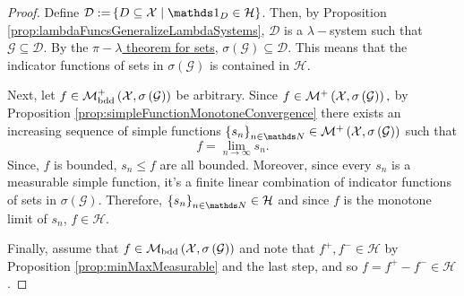 \begin{proof}
Define $\mathcal{D:=}\left\{ D\subseteq\X\mid\indicate_{D}\in\mathcal{H}\right\} $.
Then, by Proposition \ref{prop:lambdaFuncsGeneralizeLambdaSystems},
$\mathcal{D}$ is a $\lambda-$system such that $\mathcal{G}\subseteq\mathcal{D}.$
By the \hyperref[cor:piLambdaGeneratingClassArg]{$\pi-\lambda$ theorem for sets},
$\sigma\left(\mathcal{G}\right)\subseteq\mathcal{D}$. This means
that the indicator functions of sets in $\sigma\left(\mathcal{G}\right)$
is contained in $\mathcal{H}$.

Next, let $f\in\mathcal{M}_{\text{bdd}}^{+}\left(\mathcal{X},\sigma\left(\mathcal{G}\right)\right)$
be arbitrary. Since $f\in\mathcal{M}^{+}\left(\mathcal{X},\sigma\left(\mathcal{G}\right)\right),$
by Proposition \ref{prop:simpleFunctionMonotoneConvergence} there
exists an increasing sequence of simple functions $\left\{ s_{n}\right\} _{n\in\N}\in\mathcal{M}^{+}\left(\X,\sigma\left(\mathcal{G}\right)\right)$
such that 
\[
f=\lim_{n\to\infty}s_{n}.
\]
Since, $f$ is bounded, $s_{n}\leq f$ are all bounded. Moreover,
since every $s_{n}$ is a measurable simple function, it's a finite
linear combination of indicator functions of sets in $\sigma\left(\mathcal{G}\right)$.
Therefore, $\left\{ s_{n}\right\} _{n\in\N}\in\mathcal{H}$ and since
$f$ is the monotone limit of $s_{n}$, $f\in\mathcal{H}$.

Finally, assume that $f\in\mathcal{M}_{\textnormal{bdd}}\left(\mathcal{X},\sigma\left(\mathcal{G}\right)\right)$
and note that $f^{+},f^{-}\in\mathcal{H}$ by Proposition \ref{prop:minMaxMeasurable}
and the last step, and so $f=f^{+}-f^{-}\in\mathcal{H}$.
\end{proof}

